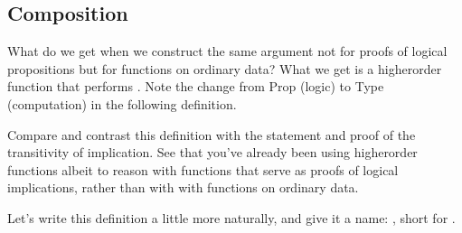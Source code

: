 \documentclass[letterpaper,10pt,english]{sphinxmanual}
\begin{document}
\subsection{Composition}
\label{\detokenize{A_03_Recursive_Types:composition}}
\sphinxAtStartPar
What do we get when we construct the same argument not
for proofs of logical propositions but for functions on
ordinary data? What we get is a higher\sphinxhyphen{}order function
that performs . Note the change
from Prop (logic) to Type (computation) in the following
definition.

\begin{sphinxVerbatim}[commandchars=\\\{\}]
                  
     
      
    
\end{sphinxVerbatim}

\sphinxAtStartPar
Compare and contrast this definition with the statement
and proof of the transitivity of implication. See that
you’ve already been using higher\sphinxhyphen{}order functions albeit
to reason with functions that serve as proofs of logical
implications, rather than with with functions on ordinary
data.

\sphinxAtStartPar
Let’s write this definition a little more naturally,
and give it a name: , short for  .

\begin{sphinxVerbatim}[commandchars=\\\{\}]
                     
      
\end{sphinxVerbatim}
\end{document}
